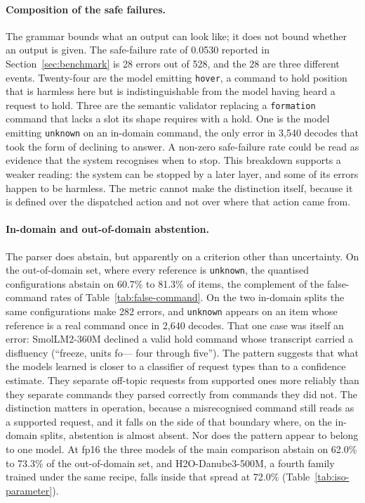 \paragraph{Composition of the safe failures.} The grammar bounds what an output can look like; it
does not bound whether an output is given. The safe-failure rate of 0.0530 reported in
Section~\ref{sec:benchmark} is 28 errors out of 528, and the 28 are three different events. Twenty-four
are the model emitting \texttt{hover}, a command to hold position that is harmless here but is
indistinguishable from the model having heard a request to hold. Three are the semantic validator
replacing a \texttt{formation} command that lacks a slot its shape requires with a hold. One is the
model emitting \texttt{unknown} on an in-domain command, the only error in 3{,}540 decodes that took
the form of declining to answer. A non-zero safe-failure rate could be read as evidence that the system recognises when to
stop. This breakdown supports a weaker reading: the system can be stopped by a later layer, and some
of its errors happen to be harmless. The metric cannot make the distinction itself, because it is
defined over the dispatched action and not over where that action came from.

\paragraph{In-domain and out-of-domain abstention.} The parser does abstain, but apparently on a criterion other
than uncertainty. On the out-of-domain set, where every reference is \texttt{unknown}, the quantised
configurations abstain on 60.7\% to 81.3\% of items, the complement of the false-command rates
of Table~\ref{tab:false-command}. On the two in-domain splits the same
configurations make 282 errors, and \texttt{unknown} appears on an item whose reference is a real
command once in 2{,}640 decodes. That one case was itself an error: SmolLM2-360M declined a valid
hold command whose transcript carried a disfluency (``freeze, units fo--- four through five'').
The pattern suggests that what the models learned is closer to a classifier of request types than
to a confidence estimate. They separate off-topic
requests from supported ones more reliably than they separate commands they parsed correctly from
commands they did not. The distinction matters
in operation, because a misrecognised command still reads as a supported request, and it falls on the side of that boundary where, on the in-domain splits,
abstention is almost absent. Nor does the pattern appear to
belong to one model. At fp16 the three models of the main comparison abstain on 62.0\% to 73.3\% of
the out-of-domain set, and H2O-Danube3-500M, a fourth family trained under the same recipe, falls
inside that spread at 72.0\% (Table~\ref{tab:iso-parameter}).


